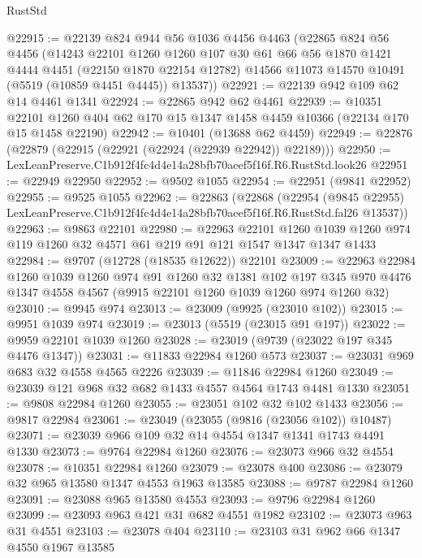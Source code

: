 \begin{lexlean}{RustStd}
\begin{coremodule}
@22915 := @22139
    @824
    @944
    @56
    @1036
    @4456
    @4463
    (@22865
      @824
      @56
      @4456
      (@14243
        @22101
        @1260
        @1260
        @107
        @30
        @61
        @66
        @56
        @1870
        @1421
        @4444
        @4451
        (@22150 @1870 @22154 @12782)
        @14566
        @11073
        @14570
        @10491
        (@5519 (@10859 @4451 @4445))
        @13537))
@22921 := @22139 @942 @109 @62 @14 @4461 @1341
@22924 := @22865 @942 @62 @4461
@22939 := @10351
    @22101
    @1260
    @404
    @62
    @170
    @15
    @1347
    @1458
    @4459
    @10366
    (@22134 @170 @15 @1458 @22190)
@22942 := @10401 (@13688 @62 @4459)
@22949 := @22876 (@22879 (@22915 (@22921 (@22924 (@22939 @22942)) @22189)))
@22950 := LexLeanPreserve.C1b912f4fc4d4e14a28bfb70aeef5f16f.R6.RustStd.look26
@22951 := @22949 @22950
@22952 := @9502 @1055
@22954 := @22951 (@9841 @22952)
@22955 := @9525 @1055
@22962 := @22863
    (@22868
      (@22954
        (@9845 @22955)
        LexLeanPreserve.C1b912f4fc4d4e14a28bfb70aeef5f16f.R6.RustStd.fal26
        @13537))
@22963 := @9863 @22101
@22980 := @22963
    @22101
    @1260
    @1039
    @1260
    @974
    @119
    @1260
    @32
    @4571
    @61
    @219
    @91
    @121
    @1547
    @1347
    @1347
    @1433
@22984 := @9707 (@12728 (@18535 @12622)) @22101
@23009 := @22963
    @22984
    @1260
    @1039
    @1260
    @974
    @91
    @1260
    @32
    @1381
    @102
    @197
    @345
    @970
    @4476
    @1347
    @4558
    @4567
    (@9915 @22101 @1260 @1039 @1260 @974 @1260 @32)
@23010 := @9945 @974
@23013 := @23009 (@9925 (@23010 @102))
@23015 := @9951 @1039 @974
@23019 := @23013 (@5519 (@23015 @91 @197))
@23022 := @9959 @22101 @1039 @1260
@23028 := @23019 (@9739 (@23022 @197 @345 @4476 @1347))
@23031 := @11833 @22984 @1260 @573
@23037 := @23031 @969 @683 @32 @4558 @4565 @2226
@23039 := @11846 @22984 @1260
@23049 := @23039 @121 @968 @32 @682 @1433 @4557 @4564 @1743 @4481 @1330
@23051 := @9808 @22984 @1260
@23055 := @23051 @102 @32 @102 @1433
@23056 := @9817 @22984
@23061 := @23049 (@23055 (@9816 (@23056 @102)) @10487)
@23071 := @23039 @966 @109 @32 @14 @4554 @1347 @1341 @1743 @4491 @1330
@23073 := @9764 @22984 @1260
@23076 := @23073 @966 @32 @4554
@23078 := @10351 @22984 @1260
@23079 := @23078 @400
@23086 := @23079 @32 @965 @13580 @1347 @4553 @1963 @13585
@23088 := @9787 @22984 @1260
@23091 := @23088 @965 @13580 @4553
@23093 := @9796 @22984 @1260
@23099 := @23093 @963 @421 @31 @682 @4551 @1982
@23102 := @23073 @963 @31 @4551
@23103 := @23078 @404
@23110 := @23103 @31 @962 @66 @1347 @4550 @1967 @13585

\end{coremodule}
\end{lexlean}
